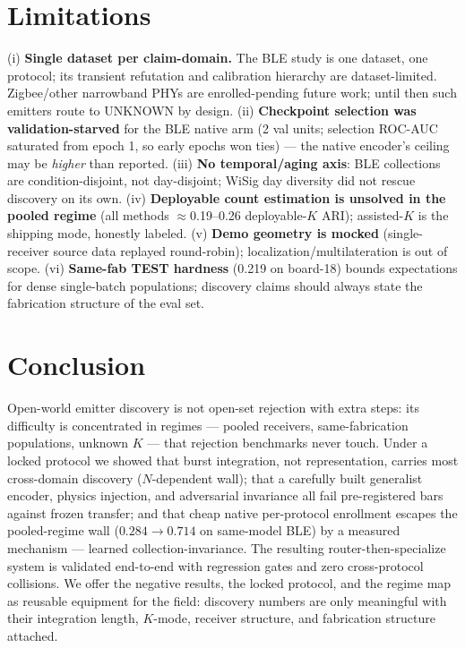 \documentclass[conference]{IEEEtran}
\begin{document}
\section{Limitations}
\label{sec:limits}

(i) \textbf{Single dataset per claim-domain.} The BLE study is one dataset, one protocol; its
transient refutation and calibration hierarchy are dataset-limited. Zigbee/other narrowband PHYs
are enrolled-pending future work; until then such emitters route to UNKNOWN by design.
(ii) \textbf{Checkpoint selection was validation-starved} for the BLE native arm (2 val units;
selection ROC-AUC saturated from epoch 1, so early epochs won ties) --- the native encoder's
ceiling may be \emph{higher} than reported. (iii) \textbf{No temporal/aging axis}: BLE collections
are condition-disjoint, not day-disjoint; WiSig day diversity did not rescue discovery on its
own. (iv) \textbf{Deployable count estimation is unsolved in the pooled regime} (all methods
$\approx$0.19--0.26 deployable-$K$ ARI); assisted-$K$ is the shipping mode, honestly labeled.
(v) \textbf{Demo geometry is mocked} (single-receiver source data replayed round-robin);
localization/multilateration is out of scope. (vi) \textbf{Same-fab TEST hardness} (0.219 on
board-18) bounds expectations for dense single-batch populations; discovery claims should always
state the fabrication structure of the eval set.

\section{Conclusion}

Open-world emitter discovery is not open-set rejection with extra steps: its difficulty is
concentrated in regimes --- pooled receivers, same-fabrication populations, unknown $K$ --- that
rejection benchmarks never touch. Under a locked protocol we showed that burst integration, not
representation, carries most cross-domain discovery ($N$-dependent wall); that a carefully built
generalist encoder, physics injection, and adversarial invariance all fail pre-registered bars
against frozen transfer; and that cheap native per-protocol enrollment escapes the pooled-regime
wall ($0.284\!\to\!0.714$ on same-model BLE) by a measured mechanism --- learned
collection-invariance. The resulting router-then-specialize system is validated end-to-end with
regression gates and zero cross-protocol collisions. We offer the negative results, the locked
protocol, and the regime map as reusable equipment for the field: discovery numbers are only
meaningful with their integration length, $K$-mode, receiver structure, and fabrication
structure attached.
\end{document}
